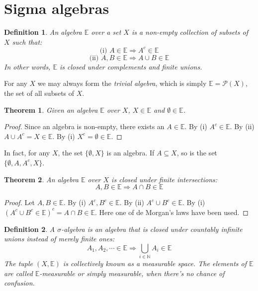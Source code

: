 \documentclass[12pt, a4paper]{article}
\newtheorem{theorem}{Theorem}[section]
\newtheorem{definition}{Definition}[section]
\numberwithin{equation}{section}
\begin{document}
\section{Sigma algebras}
\begin{definition}
An \textit{algebra} $\mathbb{E}$ over a set $X$ is a non-empty collection of subsets of $X$ such that:
\begin{equation}
\textrm{(i) }A\in\mathbb{E}\Rightarrow A^c\in\mathbb{E}
\end{equation}
\begin{equation}
\textrm{(ii) }A, B\in\mathbb{E}\Rightarrow A\cup B\in\mathbb{E}
\end{equation}
In other words, $\mathbb{E}$ is closed under complements and finite unions.
\end{definition}

For any $X$ we may always form the \textit{trivial algebra}, which is simply $\mathbb{E}=\mathcal{P}(X)$, the set of all subsets of $X$.

\begin{theorem}
Given an algebra $\mathbb{E}$ over $X$, $X\in\mathbb{E}$ and $\emptyset\in\mathbb{E}$.
\end{theorem}
\begin{proof}
Since an algebra is non-empty, there exists an $A\in\mathbb{E}$. By (i) $A^c\in\mathbb{E}$. By (ii) $A\cup A^c=X\in\mathbb{E}$. By (i) $X^c=\emptyset\in\mathbb{E}$.
\end{proof}

In fact, for any $X$, the set $\{\emptyset,X\}$ is an algebra. If $A\subseteq X$, so is the set $\{\emptyset,A,A^c,X\}$.

\begin{theorem}
\label{finite_union}
An algebra $\mathbb{E}$ over $X$ is closed under finite intersections:
\begin{equation}
A, B\in\mathbb{E}\Rightarrow A\cap B\in\mathbb{E}
\end{equation}
\end{theorem}
\begin{proof}
Let $A, B\in\mathbb{E}$. By (i) $A^c, B^c\in\mathbb{E}$. By (ii) $A^c\cup B^c\in\mathbb{E}$. By (i) $(A^c\cup B^c\in\mathbb{E})^c=A\cap B\in\mathbb{E}$. Here one of de Morgan's laws have been used.
\end{proof}

\begin{definition}
A $\sigma$-algebra is an algebra that is closed under countably infinite unions instead of merely finite ones:
\begin{equation}
A_1, A_2,\cdots\in\mathbb{E}\Rightarrow\underset{i\in\mathbb{N}}{\bigcup}A_i\in\mathbb{E}
\end{equation}
The tuple $(X,\mathbb{E})$ is collectively known as a measurable space. The elements of $\mathbb{E}$ are called $\mathbb{E}$-measurable or simply measurable, when there's no chance of confusion.
\end{definition}
\end{document}
